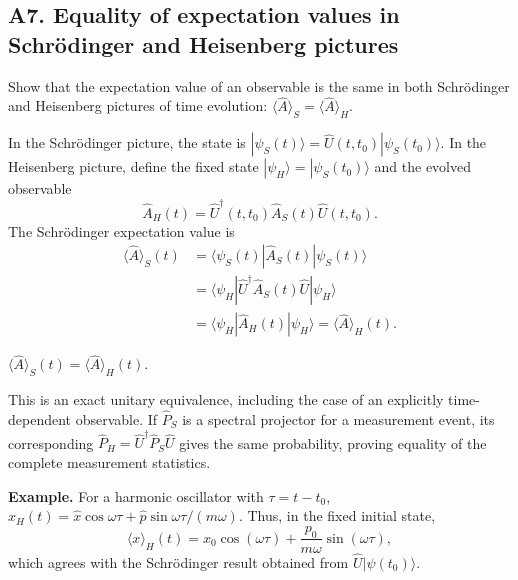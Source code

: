 \documentclass[11pt,a4paper]{article}
\newcommand{\key}[1]{\begin{resultbox}\centering\(\displaystyle #1\)\end{resultbox}}
\newcommand{\avg}[1]{\langle #1\rangle}\newcommand{\Sch}{Schr\"odinger}
\newcommand{\bra}[1]{\langle #1|}\newcommand{\ket}[1]{|#1\rangle}
\begin{document}
\subsection{A7. Equality of expectation values in Schr\"odinger and Heisenberg pictures}
\begin{questionbox}
Show that the expectation value of an observable is the same in both Schr\"odinger and Heisenberg pictures of time evolution: \(\langle\hat A\rangle_S=\langle\hat A\rangle_H\).
\end{questionbox}
In the Schr\"odinger picture, the state is \(\ket{\psi_S(t)}=\hat U(t,t_0)\ket{\psi_S(t_0)}\). In the Heisenberg picture, define the fixed state \(\ket{\psi_H}=\ket{\psi_S(t_0)}\) and the evolved observable
\begin{equation}\hat A_H(t)=\hat U^\dagger(t,t_0)\hat A_S(t)\hat U(t,t_0).\end{equation}
The Schr\"odinger expectation value is
\begin{align}
\avg{\hat A}_S(t)&=\bra{\psi_S(t)}\hat A_S(t)\ket{\psi_S(t)}\\
&=\bra{\psi_H}\hat U^\dagger\hat A_S(t)\hat U\ket{\psi_H}\\
&=\bra{\psi_H}\hat A_H(t)\ket{\psi_H}=\avg{\hat A}_H(t).
\end{align}
\key{\boxed{\avg{\hat A}_S(t)=\avg{\hat A}_H(t).}}
This is an exact unitary equivalence, including the case of an explicitly time-dependent observable. If \(\hat P_S\) is a spectral projector for a measurement event, its corresponding \(\hat P_H=\hat U^\dagger\hat P_S\hat U\) gives the same probability, proving equality of the complete measurement statistics.

\textbf{Example.} For a harmonic oscillator with \(\tau=t-t_0\), \(\hat x_H(t)=\hat x\cos\omega\tau+\hat p\sin\omega\tau/(m\omega)\). Thus, in the fixed initial state,
\begin{equation}\avg{x}_H(t)=x_0\cos(\omega\tau)+\frac{p_0}{m\omega}\sin(\omega\tau),\end{equation}
which agrees with the Schr\"odinger result obtained from \(\hat U\ket{\psi(t_0)}\).
\end{document}
